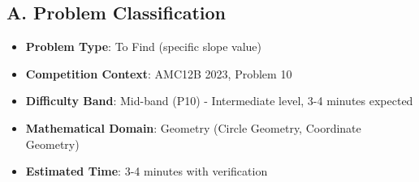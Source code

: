 \documentclass[12pt]{article}
\begin{document}
\begin{problemconfigbox}
\subsection*{A. Problem Classification}
\begin{itemize}[leftmargin=*]
    \item \textbf{Problem Type}: To Find (specific slope value)
    \item \textbf{Competition Context}: AMC12B 2023, Problem 10
    \item \textbf{Difficulty Band}: Mid-band (P10) - Intermediate level, 3-4 minutes expected
    \item \textbf{Mathematical Domain}: Geometry (Circle Geometry, Coordinate Geometry)
    \item \textbf{Estimated Time}: 3-4 minutes with verification
\end{itemize}


\end{problemconfigbox}
\end{document}
